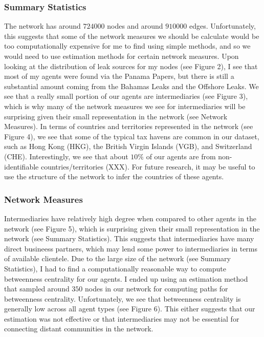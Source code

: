 \documentclass[11pt]{article}
\begin{document}
\subsubsection{Summary Statistics}

The network has around $724000$ nodes and around $910000$ edges. Unfortunately,
this suggests that some of the network measures we should be
calculate would be too computationally expensive for me to find using simple
methods, and so we would need to use estimation methods for certain
network measures. Upon looking at the distribution of leak sources for my nodes
(see Figure 2), I see that most of my agents were found via the Panama Papers,
but there is still a substantial amount
coming from the Bahamas Leaks and the Offshore Leaks. 
We see that a really small portion of our agents are intermediaries
(see Figure 3), which is why many of the network measures we see for
intermediaries will be surprising given their small representation in the 
network (see Network Measures).
In terms of countries and territories represented in the network (see Figure 4),
we see that some of the typical tax havens are common in our dataset, such
as Hong Kong (HKG), the British Virgin Islands (VGB), and Switzerland (CHE).
Interestingly, we see that about $10\%$ of our agents are from non-identifiable
countries/territories (XXX). For future research, it may be useful to use the
structure of the network to infer the countries of these agents.

\subsubsection{Network Measures}

Intermediaries have relatively high degree when compared to
other agents in the network (see Figure 5), which is surprising given their
small representation in the network (see Summary Statistics). This suggests that
intermediaries have many direct busineess partners, which may lend some power
to intermediaries in terms of available clientele. Due to the large size of
the network (see Summary Statistics), I had to find a computationally reasonable
way to compute betweenness centrality for our agents. I ended up using an
estimation method that sampled around $350$ nodes in our network for
computing paths for betweenness centrality. Unfortunately, we see that
betweenness centrality is generally low across all agent types (see Figure 6).
This either suggests that our estimation was not effective or that 
intermediaries may not be essential for connecting distant communities in the 
network.
\end{document}
